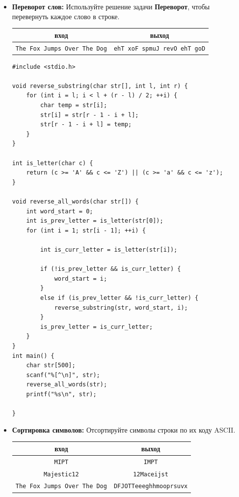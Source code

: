 \documentclass{article}
\begin{document}
\newpage
\begin{itemize}
\item \textbf{Переворот слов:} Используйте решение задачи \textbf{Переворот}, чтобы перевернуть каждое слово в строке.
\begin{center}
\begin{tabular}{ c | c }
 вход & выход \\ \hline
 \texttt{The Fox Jumps Over The Dog} & \texttt{ehT xoF spmuJ revO ehT goD} \\
\end{tabular}
\end{center}

\begin{lstlisting}[backgroundcolor = \color{solcolor}]
#include <stdio.h>

void reverse_substring(char str[], int l, int r) {
    for (int i = l; i < l + (r - l) / 2; ++i) {
        char temp = str[i];
        str[i] = str[r - 1 - i + l];
        str[r - 1 - i + l] = temp;
    }
}

int is_letter(char c) {
    return (c >= 'A' && c <= 'Z') || (c >= 'a' && c <= 'z');
}

void reverse_all_words(char str[]) {
    int word_start = 0;
    int is_prev_letter = is_letter(str[0]);
    for (int i = 1; str[i - 1]; ++i) {
        
        int is_curr_letter = is_letter(str[i]);
        
        if (!is_prev_letter && is_curr_letter) {
            word_start = i;
        }
        else if (is_prev_letter && !is_curr_letter) {
            reverse_substring(str, word_start, i);
        }
        is_prev_letter = is_curr_letter;
    }
}
int main() {
    char str[500];
    scanf("%[^\n]", str);
    reverse_all_words(str);
    printf("%s\n", str);
    
}
\end{lstlisting}

\newpage
\item \textbf{Сортировка символов:} Отсортируйте символы строки по их коду ASCII.
\begin{center}
\begin{tabular}{ c | c }
 вход & выход \\ \hline
 \texttt{MIPT} & \texttt{IMPT} \\
 \texttt{Majestic12} & \texttt{12Maceijst} \\
 \texttt{The Fox Jumps Over The Dog} & \quad \quad \quad \texttt{DFJOTTeeeghhmooprsuvx} \\
\end{tabular}
\end{center}


\end{itemize}
\end{document}
